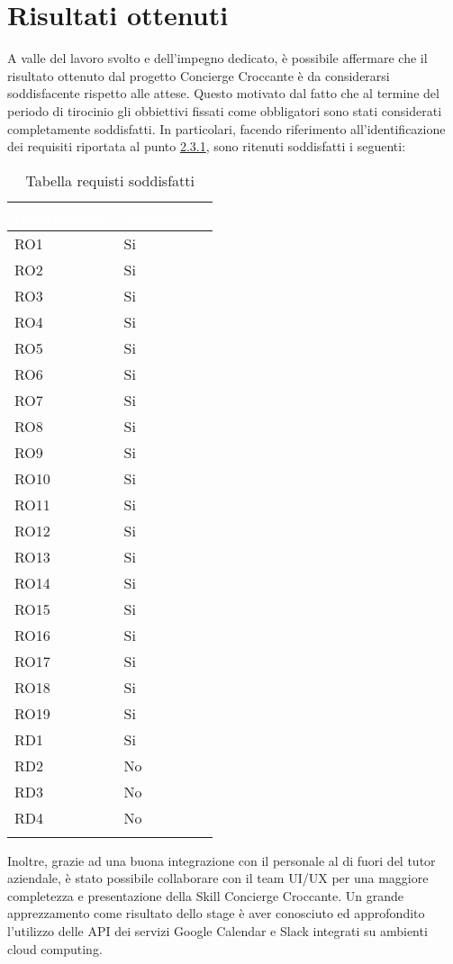 \section{Risultati ottenuti}
A valle del lavoro svolto e dell'impegno dedicato, è possibile affermare che il risultato ottenuto dal progetto Concierge Croccante è da considerarsi soddisfacente rispetto alle attese. Questo motivato dal fatto che al termine del periodo di tirocinio gli obbiettivi fissati come obbligatori sono stati considerati completamente soddisfatti. In particolari, facendo riferimento all'identificazione dei requisiti riportata al punto \hyperref[indentificazione-requisiti]{2.3.1}, sono ritenuti soddisfatti i seguenti:
\newpage
\begin{center}
	\centering
	\renewcommand{\arraystretch}{1.5}
	\begin{longtable}{  p{2.5cm} p{2.5cm} }
		\rowcolor{tableHead}
		\textbf{\textcolor{white}{Identificativo}} & \textbf{\textcolor{white}{Soddisfatto}} \\
		\endhead  
		RO1 & Si \\
		RO2 & Si \\ 
		RO3 & Si \\
		RO4 & Si \\
		RO5 & Si \\
		RO6 & Si \\
		RO7 & Si \\
		RO8 & Si \\
		RO9 & Si \\
		RO10 & Si \\
		RO11 & Si \\
	    RO12 & Si \\
	    RO13 & Si \\
	    RO14 & Si \\
	    RO15 & Si \\
	    RO16 & Si \\
	    RO17 & Si \\
		RO18 & Si \\
		RO19 & Si \\
		RD1 & Si \\
		RD2 & No \\
		RD3 & No \\
		RD4 & No \\
		\rowcolor{white}
		\caption{Tabella requisti soddisfatti}
	\end{longtable}
\end{center}
Inoltre, grazie ad una buona integrazione con il personale al di fuori del tutor aziendale, è stato possibile collaborare con il team UI/UX per una maggiore completezza e presentazione della Skill Concierge Croccante.
Un grande apprezzamento come risultato dello stage è aver conosciuto ed approfondito l'utilizzo delle API dei servizi Google Calendar e Slack integrati su ambienti cloud computing.

